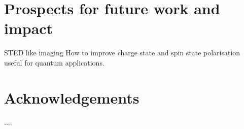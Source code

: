 \documentclass[prl]{revtex4}
\begin{document}
\section{Prospects for future work and impact}
STED like imaging
How to improve charge state and spin state polarisation useful for quantum applications.


\section{}





%


\section*{Acknowledgements}

....

%
%
%




\begin{thebibliography}{27}






\end{thebibliography}
\end{document}

